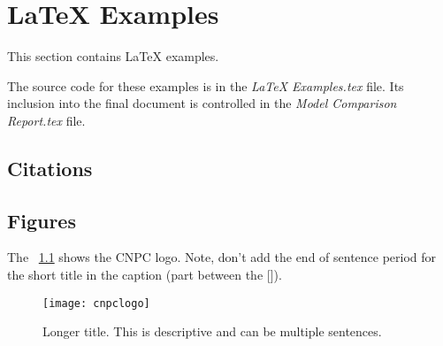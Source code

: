 \chapter{\LaTeX{} Examples}
This section contains \LaTeX{} examples.  

The source code for these examples is in the \textit{LaTeX Examples.tex} file.  Its inclusion into the final document is controlled in the \textit{Model Comparison Report.tex} file.

\section{Citations}



\section{Figures}
The \figurename~\ref{fig:cnpclogo} shows the CNPC logo.  Note, don't add the end of sentence period for the short title in the caption (part between the []).
\begin{figure}
	\centering
	\texttt{[image: cnpclogo]}
	\caption[Short title for list of figures]{Longer title.  This is descriptive and can be multiple sentences.}
	\label{fig:cnpclogo}
\end{figure}

